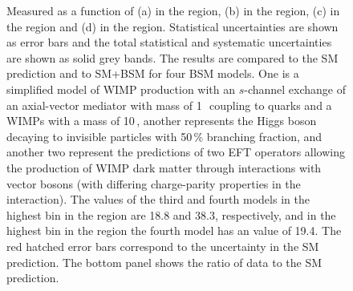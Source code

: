\documentclass[cernpreprint,txfonts,UKenglish,texlive=2016]{\ATLASLATEXPATH atlasdoc}
\begin{document}
\begin{figure}[htbp]
\begin{center}
        \end{center}
        \caption {Measured \Rmiss{} as a function of (a)
          \ptmiss{} in the \onejet{} region, (b) \ptmiss{} in the \vbf{}
          region, (c) \mjj{} in the \vbf{} region and (d)  \dphijj{} in
          the \vbf{} region. Statistical uncertainties are shown as
          error bars and the total statistical and systematic uncertainties
          are shown as solid grey bands. The results are compared to
          the SM prediction and to SM+BSM for
          four BSM models. One is a simplified model of WIMP production with 
          an $s$-channel exchange of an axial-vector mediator with mass of 1\,\TeV\ coupling to quarks and a
         WIMPs with a mass of 10\,\GeV, another represents the Higgs boson decaying to invisible
         particles with 50\,\% branching fraction, and another two represent the predictions of two EFT operators 
         allowing the production of WIMP dark matter through
         interactions with vector bosons (with differing charge-parity properties in the interaction). The \Rmiss{} values 
         of the third and fourth models in the highest \ptmiss{} bin in the \onejet{} region are 18.8 and 38.3, respectively,
         and in the highest \ptmiss{} bin in the \vbf{} region the fourth model has an \Rmiss{} value of 19.4. 
         The red hatched error bars correspond to the uncertainty in the SM prediction.
The bottom panel shows the ratio of data to the SM prediction.}
  \label{fig:final-combined-ratios}
\end{figure}
\end{document}
